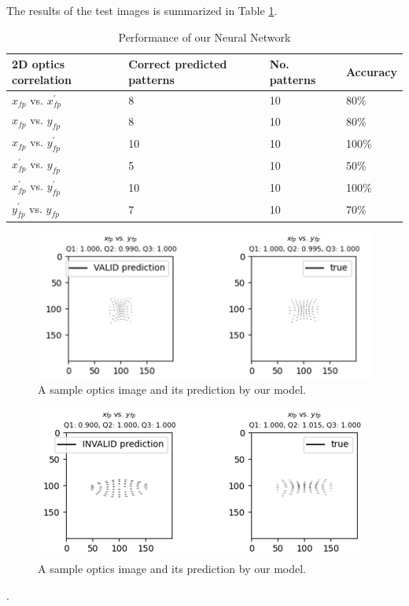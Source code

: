 \documentclass[conference]{IEEEtran}
\begin{document}
The results of the test images is summarized in Table \ref{tab:results}.
\begin{table}[h]
	\begin{center}
		\begin{tabular}{llll} %
                  \hline
                  2D optics correlation   &  Correct predicted patterns &  No. patterns  & Accuracy \\ \hline \hline
                  $x_{fp}$ vs. $x^{'}_{fp}$  &  8  &  10  &  80\%\\
                  $x_{fp}$ vs. $y_{fp}$  &  8  &  10  &  80\%\\
                  $x_{fp}$ vs. $y^{'}_{fp}$  &  10  &  10  &  100\%\\
                  $x^{'}_{fp}$ vs. $y_{fp}$  &  5  &  10  &  50\%\\
                  $x^{'}_{fp}$ vs. $y^{'}_{fp}$  &  10  &  10  &  100\%\\
                  $y^{'}_{fp}$ vs. $y_{fp}$  &  7  &  10  &  70\%\\
		  \hline
		\end{tabular}
	\end{center}
	\caption{Performance of our Neural Network}
	\label{tab:results}
\end{table}
\begin{figure}[h]
  \centering
  \includegraphics[scale=0.57]{images/valid.png}
  \caption{A sample optics image and its prediction by our model.}
  \label{fig: images and their predicted images}
\end{figure}
\begin{figure}[h]
  \centering
  \includegraphics[scale=0.57]{images/invalid.png}
  \caption{A sample optics image and its prediction by our model.}
  \label{fig: images and their predicted images}
\end{figure}.
\end{document}
